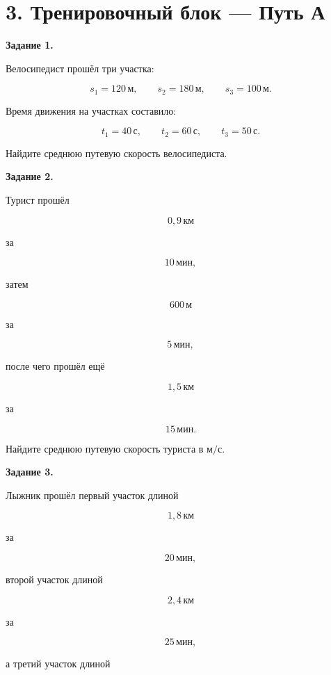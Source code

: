 \documentclass[a4paper,12pt]{article}
\newcommand{\unit}[1]{\,\text{#1}}
\begin{document}

\clearpage

\section*{3. Тренировочный блок --- Путь А}

\textbf{Задание 1.}

Велосипедист прошёл три участка:

\[
s_1=120\unit{м},
\qquad
s_2=180\unit{м},
\qquad
s_3=100\unit{м}.
\]

Время движения на участках составило:

\[
t_1=40\unit{с},
\qquad
t_2=60\unit{с},
\qquad
t_3=50\unit{с}.
\]

Найдите среднюю путевую скорость велосипедиста.

\vspace{2em}

\textbf{Задание 2.}

Турист прошёл

\[
0{,}9\unit{км}
\]

за

\[
10\unit{мин},
\]

затем

\[
600\unit{м}
\]

за

\[
5\unit{мин},
\]

после чего прошёл ещё

\[
1{,}5\unit{км}
\]

за

\[
15\unit{мин}.
\]

Найдите среднюю путевую скорость туриста в $\text{м/с}$.

\vspace{2em}

\textbf{Задание 3.}

Лыжник прошёл первый участок длиной

\[
1{,}8\unit{км}
\]

за

\[
20\unit{мин},
\]

второй участок длиной

\[
2{,}4\unit{км}
\]

за

\[
25\unit{мин},
\]

а третий участок длиной
\end{document}
